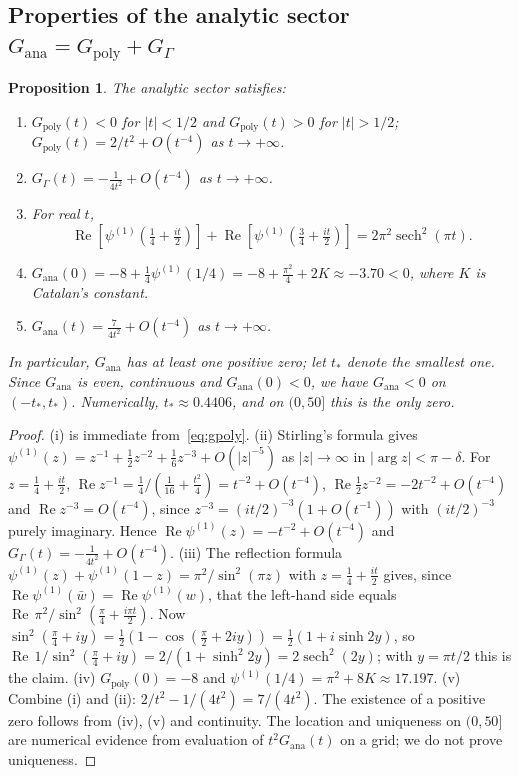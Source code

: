 \documentclass[11pt]{amsart}
\newtheorem{proposition}[theorem]{Proposition}
\renewcommand{\Re}{\operatorname{Re}}
\begin{document}
\subsection{Properties of the analytic sector \texorpdfstring{$G_{\mathrm{ana}} = G_{\mathrm{poly}} + G_\Gamma$}{G\_ana}}

\begin{proposition}\label{prop:gana}
The analytic sector satisfies:
\begin{enumerate}
  \item[\rm(i)] $G_{\mathrm{poly}}(t) < 0$ for $|t| < 1/2$ and $G_{\mathrm{poly}}(t) > 0$ for
    $|t| > 1/2$; $G_{\mathrm{poly}}(t) = 2/t^2+O(t^{-4})$ as $t \to +\infty$.
  \item[\rm(ii)] $G_\Gamma(t) = -\tfrac1{4t^2}+O(t^{-4})$ as $t \to +\infty$.
  \item[\rm(iii)] For real $t$,
    \[
      \Re\!\left[\psi^{(1)}\!\left(\tfrac{1}{4}+\tfrac{it}{2}\right)\right]
      + \Re\!\left[\psi^{(1)}\!\left(\tfrac{3}{4}+\tfrac{it}{2}\right)\right]
      = 2\pi^2\operatorname{sech}^2(\pi t).
    \]
  \item[\rm(iv)] $G_{\mathrm{ana}}(0) = -8 + \tfrac{1}{4}\psi^{(1)}(1/4) = -8+\tfrac{\pi^2}4+2K
    \approx -3.70 < 0$, where $K$ is Catalan's constant.
  \item[\rm(v)] $G_{\mathrm{ana}}(t) = \tfrac{7}{4t^2}+O(t^{-4})$ as $t \to +\infty$.
\end{enumerate}
In particular, $G_{\mathrm{ana}}$ has at least one positive zero; let $t_*$ denote the
smallest one. Since $G_{\mathrm{ana}}$ is even, continuous and $G_{\mathrm{ana}}(0)<0$, we have
$G_{\mathrm{ana}}<0$ on $(-t_*,t_*)$. Numerically, $t_*\approx 0.4406$, and on $(0,50]$ this is the only zero.
\end{proposition}

\begin{proof}
(i) is immediate from~\eqref{eq:gpoly}.
(ii) Stirling's formula gives
$\psi^{(1)}(z)=z^{-1}+\tfrac12z^{-2}+\tfrac16z^{-3}+O(|z|^{-5})$ as $|z|\to\infty$ in
$|\arg z|<\pi-\delta$. For $z=\tfrac14+\tfrac{it}2$,
$\Re z^{-1}=\tfrac14/(\tfrac1{16}+\tfrac{t^2}4)=t^{-2}+O(t^{-4})$,
$\Re\tfrac12z^{-2}=-2t^{-2}+O(t^{-4})$ and $\Re z^{-3}=O(t^{-4})$, since
$z^{-3}=(it/2)^{-3}(1+O(t^{-1}))$ with $(it/2)^{-3}$ purely imaginary. Hence
$\Re\psi^{(1)}(z)=-t^{-2}+O(t^{-4})$ and $G_\Gamma(t)=-\tfrac1{4t^2}+O(t^{-4})$.
(iii) The reflection formula $\psi^{(1)}(z)+\psi^{(1)}(1-z)=\pi^2/\sin^2(\pi z)$ with
$z=\tfrac14+\tfrac{it}2$ gives, since $\Re\psi^{(1)}(\bar w)=\Re\psi^{(1)}(w)$, that the
left-hand side equals $\Re\,\pi^2/\sin^2(\tfrac\pi4+\tfrac{i\pi t}2)$. Now
$\sin^2(\tfrac\pi4+iy)=\tfrac12(1-\cos(\tfrac\pi2+2iy))=\tfrac12(1+i\sinh 2y)$, so
$\Re\,1/\sin^2(\tfrac\pi4+iy)=2/(1+\sinh^2 2y)=2\operatorname{sech}^2(2y)$; with
$y=\pi t/2$ this is the claim.
(iv) $G_{\mathrm{poly}}(0)=-8$ and $\psi^{(1)}(1/4)=\pi^2+8K\approx17.197$.
(v) Combine (i) and (ii): $2/t^2-1/(4t^2)=7/(4t^2)$.
The existence of a positive zero follows from (iv), (v) and continuity. The location and
uniqueness on $(0,50]$ are numerical evidence from evaluation of $t^2G_{\mathrm{ana}}(t)$ on a
grid; we do not prove uniqueness.
\end{proof}
\end{document}
